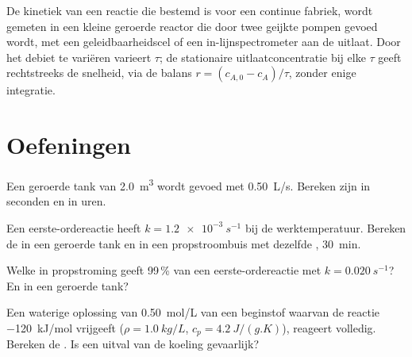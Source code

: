 \begin{inthelab}
De kinetiek van een reactie die bestemd is voor een continue fabriek, wordt gemeten in een
kleine geroerde reactor die door twee geijkte pompen gevoed wordt, met een geleidbaarheidscel
of een in-lijnspectrometer aan de uitlaat. Door het debiet te variëren varieert $\tau$;
de stationaire uitlaatconcentratie bij elke $\tau$ geeft rechtstreeks de snelheid, via de
balans $r = (c_{A,0} - c_A)/\tau$, zonder enige integratie.
\end{inthelab}

\section{Oefeningen}

\begin{exercise}[$\star$]\label{exo:b2:continuous-reactors:1}
Een geroerde tank van \qty{2.0}{m^3} wordt gevoed met \qty{0.50}{L/s}. Bereken zijn
 in seconden en in uren.
\end{exercise}

\begin{exercise}[$\star$]\label{exo:b2:continuous-reactors:2}
Een eerste-ordereactie heeft $k = \qty{1.2e-3}{s^{-1}}$ bij de
werktemperatuur. Bereken de  in een geroerde tank en in een propstroombuis
met dezelfde , \qty{30}{min}.
\end{exercise}

\begin{exercise}[$\star$]\label{exo:b2:continuous-reactors:3}
Welke  in propstroming geeft 99\,\%  van een eerste-ordereactie
met $k = \qty{0.020}{s^{-1}}$? En in een geroerde tank?
\end{exercise}

\begin{exercise}[$\star$]\label{exo:b2:continuous-reactors:4}
Een waterige oplossing van \qty{0.50}{mol/L} van een beginstof waarvan de reactie
\qty{-120}{kJ/mol} vrijgeeft ($\rho = \qty{1.0}{kg/L}$, $c_p =
\qty{4.2}{J/(g.K)}$), reageert volledig. Bereken de .
Is een uitval van de koeling gevaarlijk?
\end{exercise}

